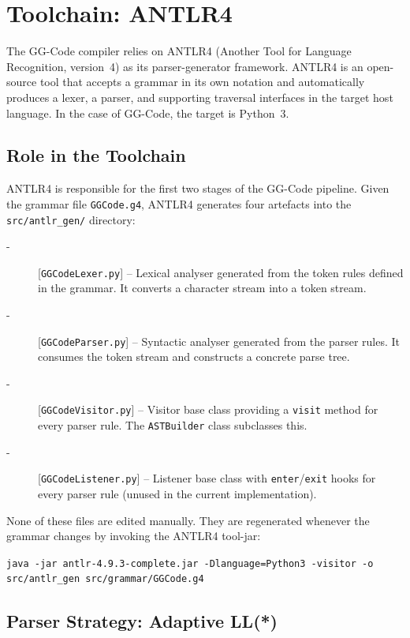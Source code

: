 \section{Toolchain: ANTLR4}

The GG-Code compiler relies on ANTLR4 (Another Tool for Language Recognition, version~4) as its parser-generator framework. ANTLR4 is an open-source tool that accepts a grammar in its own notation and automatically produces a lexer, a parser, and supporting traversal interfaces in the target host language. In the case of GG-Code, the target is Python~3.

\subsection*{Role in the Toolchain}

ANTLR4 is responsible for the first two stages of the GG-Code pipeline. Given the grammar file \texttt{GGCode.g4}, ANTLR4 generates four artefacts into the \texttt{src/antlr\_gen/} directory:

\begin{description}
    \item[-][\texttt{GGCodeLexer.py}] -- Lexical analyser generated from the token rules defined in the grammar. It converts a character stream into a token stream.
    \item[-][\texttt{GGCodeParser.py}] -- Syntactic analyser generated from the parser rules. It consumes the token stream and constructs a concrete parse tree.
    \item[-][\texttt{GGCodeVisitor.py}] -- Visitor base class providing a \texttt{visit} method for every parser rule. The \texttt{ASTBuilder} class subclasses this.
    \item[-][\texttt{GGCodeListener.py}] -- Listener base class with \texttt{enter}/\texttt{exit} hooks for every parser rule (unused in the current implementation).
\end{description}

None of these files are edited manually. They are regenerated whenever the grammar changes by invoking the ANTLR4 tool-jar:

\begin{center}
\verb|java -jar antlr-4.9.3-complete.jar -Dlanguage=Python3 -visitor -o src/antlr_gen src/grammar/GGCode.g4|
\end{center}

\subsection*{Parser Strategy: Adaptive LL(*)}

